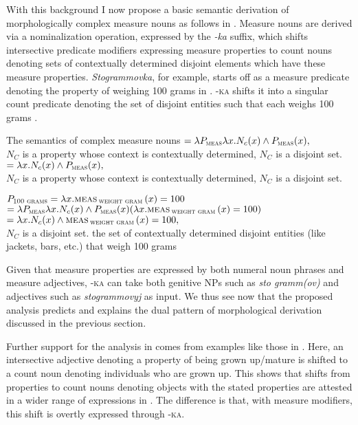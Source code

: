 \documentclass[output=paper,
colorlinks,
citecolor=brown,
newtxmath
]{langscibook}
\begin{document}
\noindent With this background I now propose a basic semantic derivation of morphologically complex measure nouns as follows in . Measure nouns are derived via a nominalization operation, expressed by the \textit{-ka} suffix, which shifts intersective predicate modifiers expressing measure properties to count nouns denoting sets of contextually determined disjoint elements which have these measure properties. \textit{Stogrammovka}, for example, starts off as a measure predicate denoting the property of weighing 100 grams in . \textsc{-ka} shifts it into a singular count predicate denoting the set of disjoint entities such that each weighs 100 grams .

\ea\label{ex:khrizmann:17} The semantics of complex measure nouns
    \ea\label{ex:khrizmann:17a}  $= \lambda P_{\textsc{meas}} \lambda x.N_{c}(x) \wedge P_{\textsc{meas}}(x),$\\
    {\small $N_C$ is a property whose context is contextually determined, $N_C$ is a disjoint set.}
    \ex\label{ex:khrizmann:17b}  $= \lambda x. N_{c}(x) \wedge P_{\textsc{meas}}(x),$\\
    {\small $N_C$ is a property whose context is contextually determined, $N_C$ is a disjoint set.}
\z\z

\ea\label{ex:khrizmann:18}
    \ea\label{ex:khrizmann:18a} $P_{\textsc{100 grams}} = \lambda x. \textsc{meas}\,_{\textsc{weight gram}}\,(x) = 100$
    \ex\label{ex:khrizmann:18b}  $= \lambda P_{\textsc{meas}} \lambda x.N_{c}(x) \wedge P_{\textsc{meas}}(x) (\lambda x.\textsc{meas}\,_{\textsc{weight gram}}\,(x) = 100)$\\
            $= \lambda x.N_{c}(x) \wedge \textsc{meas}\,_{\textsc{weight gram}}\,(x) = 100,$\\
            \hspace{.7em} {\small $N_C$ is a disjoint set.}
    \z
    {\small the set of contextually determined disjoint entities (like jackets, bars, etc.) that weigh 100 grams}
\z

\noindent Given that measure properties are expressed by both numeral noun phrases and measure adjectives, \textsc{-ka} can take both genitive NPs such as \textit{sto gramm(ov)} and adjectives such as \textit{stogrammovyj} as input. We thus see now that the proposed analysis predicts and explains the dual pattern of morphological derivation discussed in the previous section.

Further support for the analysis in  comes from examples like those in . Here, an intersective adjective denoting a property of being grown up/\hspace{0pt}mature is shifted to a count noun denoting individuals who are grown up. This shows that shifts from properties to count nouns denoting objects with the stated properties are attested in a wider range of expressions in . The difference is that, with measure modifiers, this shift is overtly expressed through \textsc{-ka}.
\end{document}
